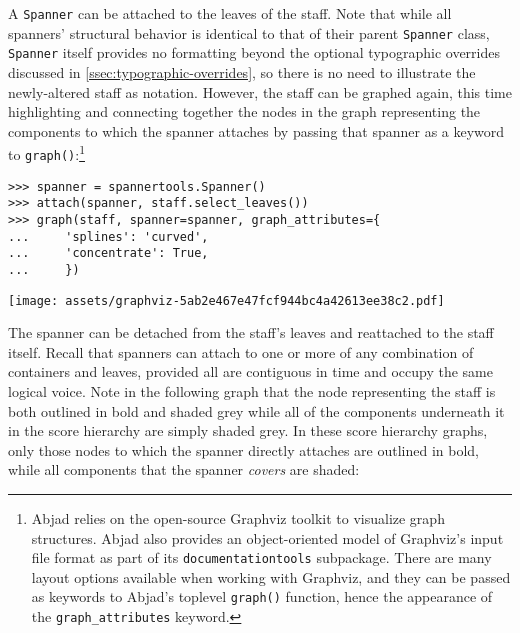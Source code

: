A \texttt{Spanner} can be attached to the leaves of the staff. Note that while
all spanners' structural behavior is identical to that of their parent
\texttt{Spanner} class, \texttt{Spanner} itself provides no formatting beyond
the optional typographic overrides discussed in
\autoref{ssec:typographic-overrides}, so there is no need to illustrate the
newly-altered staff as notation. However, the staff can be graphed again, this
time highlighting and connecting together the nodes in the graph representing
the components to which the spanner attaches by passing that spanner as a
keyword to \texttt{graph()}:\footnote{Abjad relies on the open-source Graphviz
toolkit to visualize graph structures. Abjad also provides an object-oriented
model of Graphviz's input file format as part of its
\texttt{documentationtools} subpackage. There are many layout options available
when working with Graphviz, and they can be passed as keywords to Abjad's
toplevel \texttt{graph()} function, hence the appearance of the
\texttt{graph\_attributes} keyword.}

\begin{comment}
<abjad>
spanner = spannertools.Spanner()
attach(spanner, staff.select_leaves())
graph(staff, spanner=spanner, graph_attributes={
    'splines': 'curved',
    'concentrate': True,
    })
</abjad>
\end{comment}

\begin{abjadbookoutput}
\begin{singlespacing}
\vspace{-0.5\baselineskip}
\begin{lstlisting}
>>> spanner = spannertools.Spanner()
>>> attach(spanner, staff.select_leaves())
>>> graph(staff, spanner=spanner, graph_attributes={
...     'splines': 'curved',
...     'concentrate': True,
...     })
\end{lstlisting}
\noindent\texttt{[image: assets/graphviz-5ab2e467e47fcf944bc4a42613ee38c2.pdf]}
\end{singlespacing}
\end{abjadbookoutput}

The spanner can be detached from the staff's leaves and reattached to the staff
itself. Recall that spanners can attach to one or more of any combination of
containers and leaves, provided all are contiguous in time and occupy the same
logical voice. Note in the following graph that the node representing the staff
is both outlined in bold and shaded grey while all of the components underneath
it in the score hierarchy are simply shaded grey. In these score hierarchy
graphs, only those nodes to which the spanner directly attaches are outlined in
bold, while all components that the spanner \emph{covers} are shaded:

